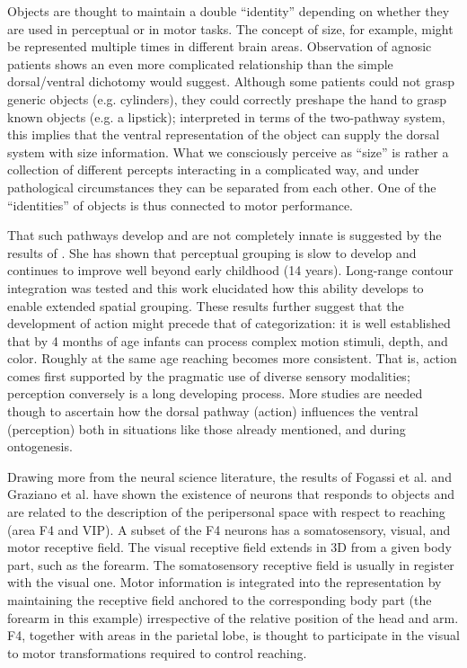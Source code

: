 
Objects are thought to maintain a double ``identity'' depending on
whether they are used in perceptual or in motor tasks. The concept of
size, for example, might be represented multiple times in different
brain areas. Observation of agnosic
patients \cite{jeannerod97cognitive} shows an even more complicated
relationship than the simple dorsal/ventral dichotomy would
suggest.  Although some patients could not grasp generic objects
(e.g. cylinders), they could correctly preshape the hand to grasp
known objects (e.g. a lipstick); interpreted in terms of the
two-pathway system, this implies that the ventral representation of
the object can supply the dorsal system with size information. What we
consciously perceive as ``size'' is rather a collection of different
percepts interacting in a complicated way, and under pathological
circumstances they can be separated from each other. One of the
``identities'' of objects is thus connected to motor performance.

That such pathways develop and are not completely innate is suggested
by the results of \cite{kovacs00human}. She has shown that
perceptual grouping is slow to develop and continues to improve well
beyond early childhood (14 years). Long-range contour integration was
tested and this work elucidated how this ability develops to enable
extended spatial grouping. These results further suggest that the
development of action might precede that of categorization: it is well
established that by 4 months of age infants can process complex
motion stimuli, depth, and color.  Roughly at the same age reaching
becomes more consistent.  That is, action comes first
supported by the pragmatic use of diverse sensory modalities;
perception conversely is a long developing process. More studies are
needed though to ascertain how the dorsal pathway (action) influences
the ventral (perception) both in situations like those
already mentioned, and during ontogenesis.

Drawing more from the neural science literature, the results of Fogassi et al.
\cite{fogassi96coding} and Graziano et al. \cite{graziano-hu-gross-1997} have 
shown the existence of neurons that responds to objects and are related to the
description of the peripersonal space with respect to reaching (area F4 and VIP).
A subset of the F4 neurons has a somatosensory, visual, and motor receptive
field. The visual receptive field extends in 3D from a given body part, such
as the forearm. The somatosensory receptive field is usually in register with
the visual one. Motor information is integrated into the representation 
by maintaining the receptive field anchored to the corresponding body part
(the forearm in this example) irrespective of the relative position of the
head and arm. F4, together with areas in the parietal lobe, is thought to 
participate in the visual to motor transformations required to control 
reaching.

